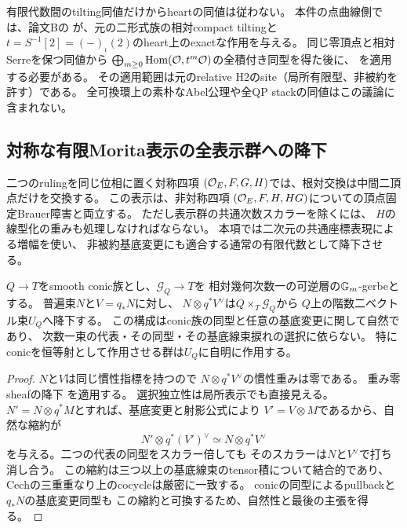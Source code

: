 \begin{remark}[相対heartへの比較に必要な追加論証]
有限代数間のtilting同値だけからheartの同値は従わない。
本件の点曲線側では、論文Bの
\cite[\texttt{lem:nc-relative-normal-tilting},
\texttt{prop:nc-root-ample-orbit}]{QuadricModuli2026}
が、元の二形式族の相対compact tiltingと
$t=S^{-1}[2]=(-)_\iota(2)$のheart上のexactな作用を与える。
同じ零頂点と相対Serreを保つ同値から
$\bigoplus_{m\ge0}\operatorname{Hom}(\mathcal O,t^m\mathcal O)$の全積付き同型を得た後に、
\cite[\texttt{prop:relative-h2-antiserre-reconstruction}]{QuadricModuli2026}
を適用する必要がある。
その適用範囲は元のrelative H2のsite（局所有限型、非被約を許す）である。
全可換環上の素朴なAbel公理や全QP stackの同値はこの議論に含まれない。
\end{remark}


\subsection{対称な有限Morita表示の全表示群への降下}
\label{subsec:qa-symmetric-full-group-descent}

二つのrulingを同じ位相に置く対称四項
$(\mathcal O_E,F,G,H)$では、根対交換は中間二頂点だけを交換する。
この表示は、非対称四項
$(\mathcal O_E,F,H,HG)$についての頂点固定Brauer障害と両立する。
ただし表示群の共通次数スカラーを除くには、
$H$の線型化の重みも処理しなければならない。
本項では二次元の共通座標表現による増幅を使い、
非被約基底変更にも適合する通常の有限代数として降下させる。

\begin{lemma}[conicの次数一束の選択に依らない階数二束]
\label{lem:qa-conic-canonical-rank-two-bundle}
$Q\to T$をsmooth conic族とし、$\mathscr G_Q\to T$を
相対幾何次数一の可逆層の$\mathbb G_m$-gerbeとする。
普遍束$N$と$V=q_*N$に対し、
$N\otimes q^*V^\vee$は$Q\times_T\mathscr G_Q$から
$Q$上の階数二ベクトル束$U_Q$へ降下する。
この構成はconic族の同型と任意の基底変更に関して自然であり、
次数一束の代表・その同型・その基底線束捩れの選択に依らない。
特にconicを恒等射として作用させる群は$U_Q$に自明に作用する。
\end{lemma}
\begin{proof}
$N$と$V$は同じ慣性指標を持つので
$N\otimes q^*V^\vee$の慣性重みは零である。
重み零sheafの降下
\cite[Theorem~4.7]{BerghSchnurer2021}を適用する。
選択独立性は局所表示でも直接見える。
$N'=N\otimes q^*M$とすれば、基底変更と射影公式により
$V'=V\otimes M$であるから、自然な縮約が
\[
 N'\otimes q^*(V')^\vee
 \simeq N\otimes q^*V^\vee
\]
を与える。二つの代表の同型をスカラー倍しても
そのスカラーは$N$と$V^\vee$で打ち消し合う。
この縮約は三つ以上の基底線束のtensor積について結合的であり、
Cechの三重重なり上のcocycleは厳密に一致する。
conicの同型によるpullbackと$q_*N$の基底変更同型も
この縮約と可換するため、自然性と最後の主張を得る。
\end{proof}

